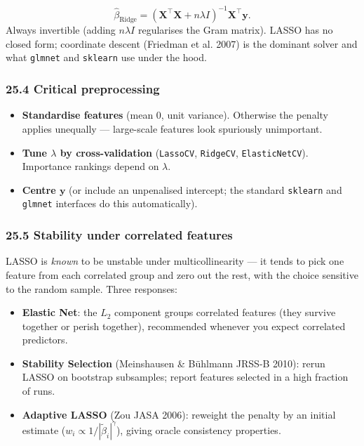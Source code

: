 \documentclass{article}
\providecommand{\tightlist}{\setlength{\itemsep}{0pt}\setlength{\parskip}{0pt}}
\begin{document}
\[
\hat{\beta}_{\mathrm{Ridge}} = (\mathbf{X}^\top \mathbf{X} + n\lambda I)^{-1} \mathbf{X}^\top \mathbf{y}.
\] Always invertible (adding \(n\lambda I\) regularises the Gram
matrix). LASSO has no closed form; coordinate descent (Friedman et al.
2007) is the dominant solver and what \texttt{glmnet} and
\texttt{sklearn} use under the hood.

\subsubsection{25.4 Critical
preprocessing}\label{254-critical-preprocessing}

\begin{itemize}
\tightlist
\item
  \textbf{Standardise features} (mean 0, unit variance). Otherwise the
  penalty applies unequally --- large-scale features look spuriously
  unimportant.
\item
  \textbf{Tune \(\lambda\) by cross-validation} (\texttt{LassoCV},
  \texttt{RidgeCV}, \texttt{ElasticNetCV}). Importance rankings depend
  on \(\lambda\).
\item
  \textbf{Centre \(\mathbf{y}\)} (or include an unpenalised intercept;
  the standard \texttt{sklearn} and \texttt{glmnet} interfaces do this
  automatically).
\end{itemize}

\subsubsection{25.5 Stability under correlated
features}\label{255-stability-under-correlated-features}

LASSO is \emph{known} to be unstable under multicollinearity --- it
tends to pick one feature from each correlated group and zero out the
rest, with the choice sensitive to the random sample. Three responses:

\begin{itemize}
\tightlist
\item
  \textbf{Elastic Net}: the \(L_2\) component groups correlated features
  (they survive together or perish together), recommended whenever you
  expect correlated predictors.
\item
  \textbf{Stability Selection} (Meinshausen \& Bühlmann JRSS-B 2010):
  rerun LASSO on bootstrap subsamples; report features selected in a
  high fraction of runs.
\item
  \textbf{Adaptive LASSO} (Zou JASA 2006): reweight the penalty by an
  initial estimate (\(w_i \propto 1/|\tilde{\beta}_i|^\gamma\)), giving
  oracle consistency properties.
\end{itemize}
\end{document}
